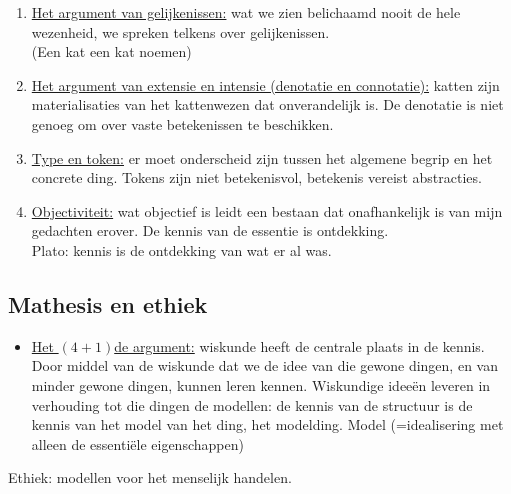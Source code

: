 \begin{enumerate}
\item \underline{Het argument van gelijkenissen:} wat we zien belichaamd nooit de hele wezenheid, we spreken telkens over gelijkenissen.
\\
(Een kat een kat noemen)
\item \underline{Het argument van extensie en intensie (denotatie en connotatie):} katten zijn materialisaties van het kattenwezen dat onverandelijk is. De denotatie is niet genoeg om over vaste betekenissen te beschikken.
\item \underline{Type en token:} er moet onderscheid zijn tussen het algemene begrip en het concrete ding. Tokens zijn niet betekenisvol, betekenis vereist abstracties.
\item \underline{Objectiviteit:} wat objectief is leidt een bestaan dat onafhankelijk is van mijn gedachten erover. De kennis van de essentie is ontdekking.
\\
Plato: kennis is de ontdekking van wat er al was.
\end{enumerate}
\subsection{Mathesis en ethiek}
\begin{itemize}
\item \underline{Het $(4+1)$de argument:}
wiskunde heeft de centrale plaats in de kennis.
Door middel van de wiskunde dat we de idee van die gewone dingen, en van minder gewone dingen, kunnen leren kennen.
Wiskundige ideeën leveren in verhouding tot die dingen de modellen: de kennis van de structuur is de kennis van het model van het ding, het modelding.  Model (=idealisering met alleen de essentiële eigenschappen)
\end{itemize}
Ethiek: modellen voor het menselijk handelen.
